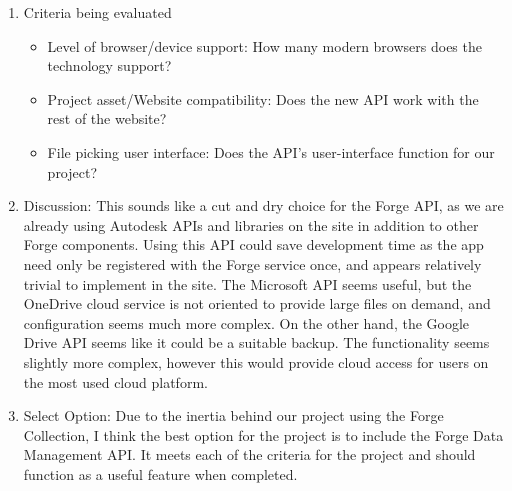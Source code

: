 \documentclass[letterpaper, 10pt, draftclsnofoot, compsoc, onecolumn]{IEEEtran}
\begin{document}
\begin{enumerate}
			\item{Criteria being evaluated}
			\begin{itemize}
					\item{Level of browser/device support: How many modern browsers does the technology support?}
					\item{Project asset/Website compatibility: Does the new API work with the rest of the website?}
					\item{File picking user interface: Does the API's user-interface function for our project?}
				\end{itemize}
			\item{Discussion:}
			This sounds like a cut and dry choice for the Forge API, as we are already using Autodesk APIs and libraries on the site in addition to other Forge components. Using this API could save development time as the app need only be registered with the Forge service once, and appears relatively trivial to implement in the site. The Microsoft API seems useful, but the OneDrive cloud service is not oriented to provide large files on demand, and configuration seems much more complex. On the other hand, the Google Drive API seems like it could be a suitable backup. The functionality seems slightly more complex, however this would provide cloud access for users on the most used cloud platform.
			\item{Select Option:}
			Due to the inertia behind our project using the Forge Collection, I think the best option for the project is to include the Forge Data Management API. It meets each of the criteria for the project and should function as a useful feature when completed. 
		\end{enumerate}
		
\end{document}
